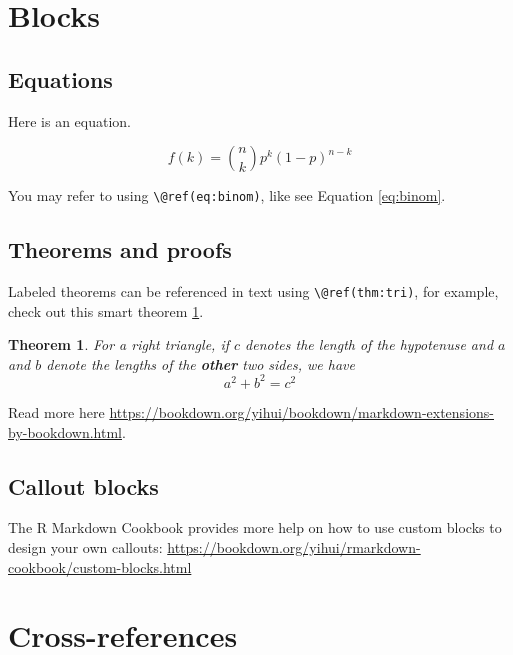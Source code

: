 \documentclass[
]{book}
\newtheorem{theorem}{Theorem}[chapter]
\theoremstyle{definition}
\theoremstyle{definition}
\theoremstyle{definition}
\theoremstyle{definition}
\theoremstyle{remark}
\begin{document}
\hypertarget{blocks}{%
\section{Blocks}\label{blocks}}

\hypertarget{equations}{%
\subsection{Equations}\label{equations}}

Here is an equation.

\begin{equation} 
  f\left(k\right) = \binom{n}{k} p^k\left(1-p\right)^{n-k}
  \label{eq:binom}
\end{equation}

You may refer to using \texttt{\textbackslash{}@ref(eq:binom)}, like see Equation \eqref{eq:binom}.

\hypertarget{theorems-and-proofs}{%
\subsection{Theorems and proofs}\label{theorems-and-proofs}}

Labeled theorems can be referenced in text using \texttt{\textbackslash{}@ref(thm:tri)}, for example, check out this smart theorem \ref{thm:tri}.

\begin{theorem}
\protect\hypertarget{thm:tri}{}\label{thm:tri}For a right triangle, if \(c\) denotes the \emph{length} of the hypotenuse
and \(a\) and \(b\) denote the lengths of the \textbf{other} two sides, we have
\[a^2 + b^2 = c^2\]
\end{theorem}

Read more here \url{https://bookdown.org/yihui/bookdown/markdown-extensions-by-bookdown.html}.

\hypertarget{callout-blocks}{%
\subsection{Callout blocks}\label{callout-blocks}}

The R Markdown Cookbook provides more help on how to use custom blocks to design your own callouts: \url{https://bookdown.org/yihui/rmarkdown-cookbook/custom-blocks.html}

\hypertarget{cross}{%
\section{Cross-references}\label{cross}}
\end{document}
